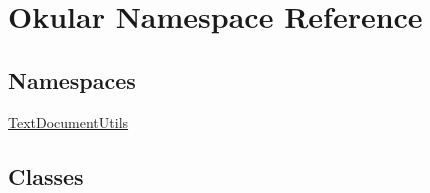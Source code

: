 \hypertarget{namespaceOkular}{\section{Okular Namespace Reference}
\label{namespaceOkular}
}
\subsection*{Namespaces}
\begin{DoxyCompactItemize}
\item 
 \hyperlink{namespaceOkular_1_1TextDocumentUtils}{Text\+Document\+Utils}
\end{DoxyCompactItemize}
\subsection*{Classes}
